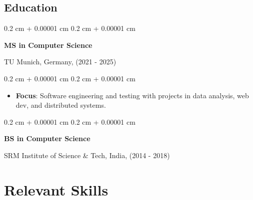 \documentclass[10pt, letterpaper]{article}
\newenvironment{highlights}{
    \begin{itemize}[
        topsep=0.10 cm,
        parsep=0.10 cm,
        partopsep=0pt,
        itemsep=0pt,
        leftmargin=0.4 cm + 10pt
    ]
}{
    \end{itemize}
} %
\newenvironment{onecolentry}{
    \begin{adjustwidth}{
        0.2 cm + 0.00001 cm
    }{
        0.2 cm + 0.00001 cm
    }
}{
    \end{adjustwidth}
} %
\begin{document}
    \begin{samepage}

        

        \section{Education}

        
        \begin{onecolentry}
        \textbf{MS in Computer Science}

	    {TU Munich, Germany, (2021 - 2025)}            
        \end{onecolentry}

        \vspace{0.10 cm}
        \begin{onecolentry}
            \begin{highlights}
                \item \textbf{Focus}: Software engineering and testing with projects in {data analysis}, web dev, and {distributed systems}.
            \end{highlights}
        \end{onecolentry}

        \end{samepage}

        \vspace{0.2cm}


        \begin{samepage}

        \begin{onecolentry}
            \textbf{BS in Computer Science}

	       {SRM Institute of Science \& Tech, India, (2014 - 2018)}
        \end{onecolentry}

        \end{samepage}


    \section{Relevant Skills}

\end{document}
